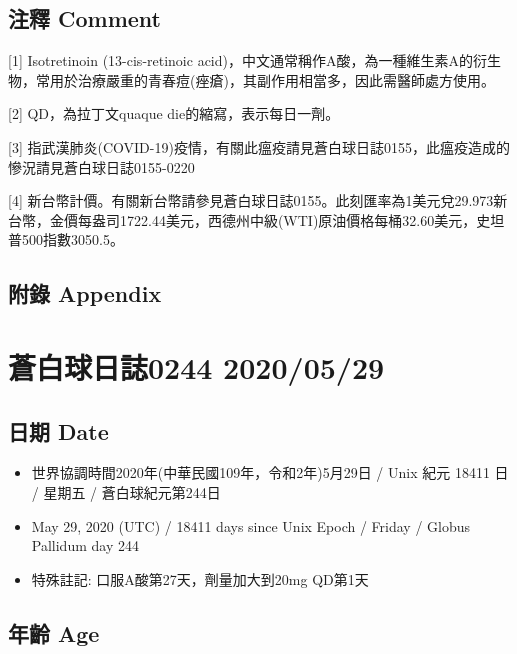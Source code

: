 \documentclass[a5paper, 11pt
]{book}
\providecommand{\tightlist}{%
  \setlength{\itemsep}{0pt}\setlength{\parskip}{0pt}}
\begin{document}
\hypertarget{ux6ce8ux91cb-comment-88}{%
\subsection{注釋 Comment}\label{ux6ce8ux91cb-comment-88}}

{[}1{]} Isotretinoin (13-cis-retinoic
acid)，中文通常稱作A酸，為一種維生素A的衍生物，常用於治療嚴重的青春痘(痤瘡)，其副作用相當多，因此需醫師處方使用。

{[}2{]} QD，為拉丁文quaque die的縮寫，表示每日一劑。

{[}3{]}
指武漢肺炎(COVID-19)疫情，有關此瘟疫請見蒼白球日誌0155，此瘟疫造成的慘況請見蒼白球日誌0155-0220

{[}4{]}
新台幣計價。有關新台幣請參見蒼白球日誌0155。此刻匯率為1美元兌29.973新台幣，金價每盎司1722.44美元，西德州中級(WTI)原油價格每桶32.60美元，史坦普500指數3050.5。

\hypertarget{ux9644ux9304-appendix-88}{%
\subsection{附錄 Appendix}\label{ux9644ux9304-appendix-88}}

\hypertarget{ux84bcux767dux7403ux65e5ux8a8c0244-20200529}{%
\section{蒼白球日誌0244
2020/05/29}\label{ux84bcux767dux7403ux65e5ux8a8c0244-20200529}}

\hypertarget{ux65e5ux671f-date-89}{%
\subsection{日期 Date}\label{ux65e5ux671f-date-89}}

\begin{itemize}
\tightlist
\item
  世界協調時間2020年(中華民國109年，令和2年)5月29日 / Unix 紀元 18411 日
  / 星期五 / 蒼白球紀元第244日
\item
  May 29, 2020 (UTC) / 18411 days since Unix Epoch / Friday / Globus
  Pallidum day 244
\item
  特殊註記: 口服A酸第27天，劑量加大到20mg QD第1天
\end{itemize}

\hypertarget{ux5e74ux9f61-age-89}{%
\subsection{年齡 Age}\label{ux5e74ux9f61-age-89}}
\end{document}

